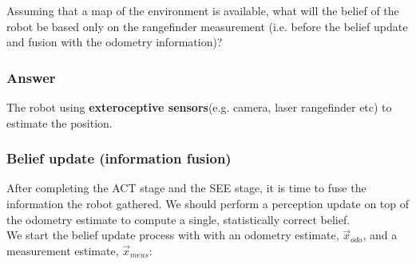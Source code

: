 \documentclass[12pt]{article}
\begin{document}
\noindent Assuming that a map of the environment is available, what will the belief of the robot be based only on the rangefinder measurement (i.e. before the belief update and fusion with the odometry information)?

\subsubsection*{Answer}

The robot using \textbf{exteroceptive sensors}(e.g. camera, laser rangefinder etc) to estimate the position.

\begin{figure}[h]
\noindent{}
\end{figure}


\pagebreak

\subsubsection{Belief update (information fusion)}

After completing the ACT stage and the SEE stage, it is time to fuse the information the robot gathered. We should perform a perception update on top of the odometry estimate to compute a single, statistically correct belief. \\

\noindent We start the belief update process with with an odometry estimate, $\vec{x}_{odo}$, and a measurement estimate, $\vec{x}_{meas}$: \\

\begin{figure}[h]
\noindent{}
\end{figure}
\end{document}
